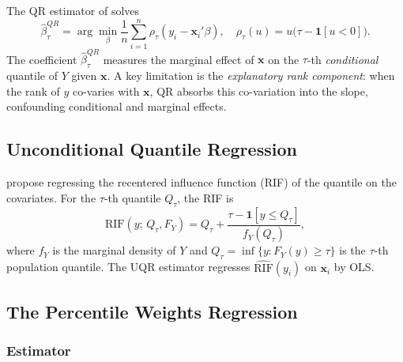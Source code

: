 \documentclass[12pt,a4paper]{article}
\theoremstyle{definition}
\newcommand{\bx}{\mathbf{x}}
\begin{document}
The QR estimator of \citet{KoenkerBassett1978} solves
\begin{equation}
  \hat{\beta}_\tau^{QR}
  = \arg\min_{\beta} \frac{1}{n}\sum_{i=1}^n
    \rho_\tau(y_i - \bx_i'\beta),\quad
  \rho_\tau(u) = u\bigl(\tau - \mathbf{1}[u<0]\bigr).
  \label{eq:qr}
\end{equation}
The coefficient $\hat{\beta}_\tau^{QR}$ measures the marginal effect of
$\bx$ on the $\tau$-th \textit{conditional} quantile of $Y$ given $\bx$.
A key limitation is the \textit{explanatory rank component}: when the
rank of $y$ co-varies with $\bx$, QR absorbs this co-variation into the
slope, confounding conditional and marginal effects.

\subsection{Unconditional Quantile Regression}

\citet{FirpoFortinLemieux2009} propose regressing the recentered
influence function (RIF) of the quantile on the covariates. For the
$\tau$-th quantile $Q_\tau$, the RIF is
\begin{equation}
  \mathrm{RIF}(y;\,Q_\tau,F_Y)
  = Q_\tau + \frac{\tau - \mathbf{1}[y \leq Q_\tau]}{f_Y(Q_\tau)},
  \label{eq:rif}
\end{equation}
where $f_Y$ is the marginal density of $Y$ and $Q_\tau =
\inf\{y: F_Y(y)\geq\tau\}$ is the $\tau$-th population quantile.
The UQR estimator regresses
$\widehat{\mathrm{RIF}}(y_i)$ on $\bx_i$ by OLS.

\subsection{The Percentile Weights Regression}
\label{sec:pwr}

\subsubsection{Estimator}
\end{document}
